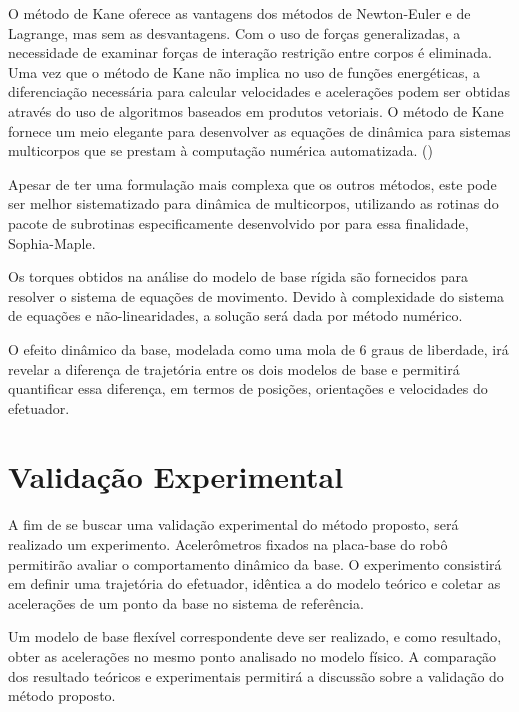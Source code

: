 O método de Kane oferece as vantagens dos métodos de Newton-Euler e de
Lagrange, mas sem as desvantagens.
Com o uso de forças generalizadas, a necessidade de examinar forças de interação
restrição entre corpos é eliminada. Uma vez que o método de Kane não implica no
uso de funções energéticas, a diferenciação necessária para calcular velocidades
e acelerações podem ser obtidas através do uso de algoritmos baseados em
produtos vetoriais. O método de Kane fornece um meio elegante para desenvolver
as equações de dinâmica para sistemas multicorpos que se prestam à computação
numérica automatizada.
(\citet{huston1991multibody})

Apesar de ter uma formulação mais complexa que os
outros métodos, este pode ser melhor sistematizado para dinâmica de
multicorpos, utilizando as rotinas do pacote de subrotinas
especificamente desenvolvido por \citet{lesser1995analysis} para
essa finalidade, Sophia-Maple.

Os torques obtidos na análise do modelo de base rígida são fornecidos para
resolver o sistema de equações de movimento. Devido à complexidade do sistema de
equações e não-linearidades, a solução será dada por método numérico.

O efeito dinâmico da base, modelada como uma mola de 6 graus de liberdade, irá
revelar a diferença de trajetória entre os dois modelos de base e permitirá
quantificar essa diferença, em termos de posições, orientações e velocidades do
efetuador.

\section{Validação Experimental}

A fim de se buscar uma validação experimental do método proposto, será realizado
um experimento.
Acelerômetros fixados na placa-base do robô permitirão avaliar o comportamento
dinâmico da base. O experimento consistirá em definir uma trajetória do
efetuador, idêntica a do modelo teórico e coletar as acelerações de um ponto
da base no sistema de referência. 

Um modelo de base flexível correspondente deve ser realizado, e como resultado,
obter as acelerações no mesmo ponto analisado no modelo físico. A comparação
dos resultado teóricos e experimentais permitirá a discussão sobre a validação
do método proposto.

